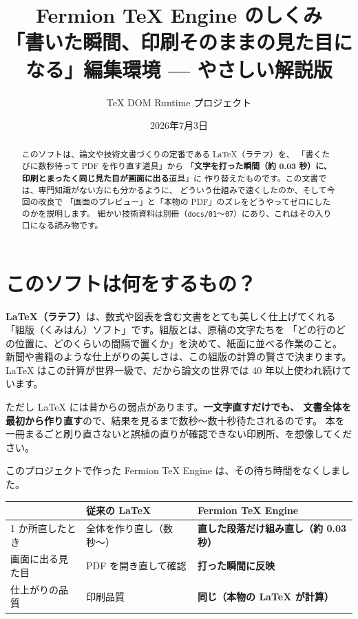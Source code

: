 \documentclass[11pt,a4paper]{ltjsarticle}
\title{\textbf{Fermion TeX Engine のしくみ}\\[0.3em]
\large 「書いた瞬間、印刷そのままの見た目になる」編集環境 --- やさしい解説版}
\author{TeX DOM Runtime プロジェクト}
\date{2026年7月3日}
\newcommand{\code}[1]{\texttt{#1}}
\begin{document}
\maketitle

\begin{abstract}
このソフトは、論文や技術文書づくりの定番である LaTeX（ラテフ）を、
「書くたびに数秒待って PDF を作り直す道具」から
「\textbf{文字を打った瞬間（約 0.03 秒）に、印刷とまったく同じ見た目が画面に出る}道具」に
作り替えたものです。この文書では、専門知識がない方にも分かるように、
どういう仕組みで速くしたのか、そして今回の改良で
「画面のプレビュー」と「本物の PDF」のズレをどうやってゼロにしたのかを説明します。
細かい技術資料は別冊（\code{docs/01}〜\code{07}）にあり、これはその入り口になる読み物です。
\end{abstract}

\tableofcontents

\section{このソフトは何をするもの？}

\textbf{LaTeX（ラテフ）}は、数式や図表を含む文書をとても美しく仕上げてくれる
「組版（くみはん）ソフト」です。組版とは、原稿の文字たちを
「どの行のどの位置に、どのくらいの間隔で置くか」を決めて、紙面に並べる作業のこと。
新聞や書籍のような仕上がりの美しさは、この組版の計算の賢さで決まります。
LaTeX はこの計算が世界一級で、だから論文の世界では 40 年以上使われ続けています。

ただし LaTeX には昔からの弱点があります。\textbf{一文字直すだけでも、
文書全体を最初から作り直す}ので、結果を見るまで数秒〜数十秒待たされるのです。
本を一冊まるごと刷り直さないと誤植の直りが確認できない印刷所、を想像してください。

このプロジェクトで作った Fermion TeX Engine は、その待ち時間をなくしました。

\begin{center}
\begin{tabular}{lll}
\toprule
 & 従来の LaTeX & \textbf{Fermion TeX Engine} \\
\midrule
1 か所直したとき & 全体を作り直し（数秒〜） & \textbf{直した段落だけ組み直し（約 0.03 秒）} \\
画面に出る見た目 & PDF を開き直して確認 & \textbf{打った瞬間に反映} \\
仕上がりの品質 & 印刷品質 & \textbf{同じ（本物の LaTeX が計算）} \\
\bottomrule
\end{tabular}
\end{center}
\end{document}
